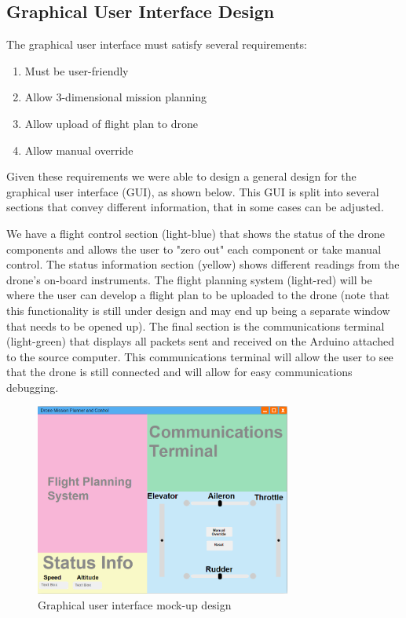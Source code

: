 \subsection{Graphical User Interface Design}
The graphical user interface must satisfy several requirements:
\begin{enumerate}
	\item Must be user-friendly
	\item Allow 3-dimensional mission planning
	\item Allow upload of flight plan to drone
	\item Allow manual override
\end{enumerate}

Given these requirements we were able to design a general design for the graphical user interface (GUI), as shown below. This GUI is split into several sections that convey different information, that in some cases can be adjusted. 

We have a flight control section (light-blue) that shows the status of the drone components and allows the user to "zero out" each component or take manual control. The status information section (yellow) shows different readings from the drone's on-board instruments. The flight planning system (light-red) will be where the user can develop a flight plan to be uploaded to the drone (note that this functionality is still under design and may end up being a separate window that needs to be opened up). The final section is the communications terminal (light-green) that displays all packets sent and received on the Arduino attached to the source computer. This communications terminal will allow the user to see that the drone is still connected and will allow for easy communications debugging.

	\begin{figure}[h!]

  		\centering
    	\includegraphics[width=0.75\textwidth]{./graphics/guiMockup.png}
   		\caption{Graphical user interface mock-up design}
	\end{figure}


%